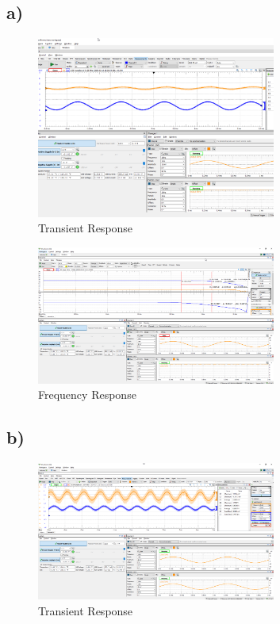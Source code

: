 \documentclass{article}
\begin{document}
	\subsection*{a)}

	\begin{figure}[H]
	    \centering
	    \includegraphics[width=0.7\textwidth]{w1a-1}
	    \caption{Transient Response}
	\end{figure}
	
	\begin{figure}[H]
	    \centering
	    \includegraphics[width=0.7\textwidth]{w1a-2-3}
	    \caption{Frequency Response}
	\end{figure}
	
	\subsection*{b)}
	
	\begin{figure}[H]
	    \centering
	    \includegraphics[width=0.7\textwidth]{w1b-1-2}
	    \caption{Transient Response}
	\end{figure}
	
\end{document}
